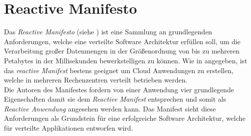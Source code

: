 \section{Reactive Manifesto}\label{reactiveManifesto}
Das \textit{Reactive Manifesto} (siehe \cite{reactiveManifesto}) ist eine Sammlung an grundlegenden Anforderungen, welche eine verteilte Software Architektur erfüllen soll, um die Verarbeitung großer Datenmengen in der Größenordnung von bis zu mehreren Petabytes in der Millisekunden bewerkstelligen zu können. 
Wie in \cite{reactiveManifesto} angegeben, ist das \textit{reactive Manifest} bestens geeignet um Cloud Anwendungen zu erstellen, welche in mehreren Rechenzentren verteilt betrieben werden. \\
Die Autoren des Manifestes fordern von einer Anwendung vier grundlegende Eigenschaften damit sie dem \textit{Reactive Manifest} entsprechen und somit als \textit{Reactive Anwendung} angesehen werden kann. Das Manifest sieht diese Anforderungen als Grundstein für eine erfolgreiche Software Architektur, welche für verteilte Applikationen entworfen wird. 

